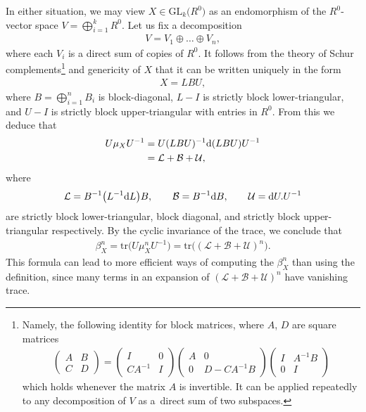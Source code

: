 \documentclass[pdftex]{sigma}%
\numberwithin{equation}{section}
\newcommand{\tr}{\mathrm{tr}}
\newcommand{\GL}{\mathrm{GL}}
\newcommand{\mc}{\mu}
\newcommand{\0}{\color{blue}{\mathsf{0}}}
\begin{document}
\noindent
In either situation,
we may view
$ X \in \GL_k\big(R^0\big) $ as an endomorphism of the $R^0$-vector space $V= \bigoplus_{i=1}^k R^0$. Let us fix a decomposition
\begin{gather*}
V= V_1 \oplus \dots \oplus V_n,
\end{gather*}
where each $V_i$ is a direct sum of copies of $R^0$. It follows from the theory of Schur complements\footnote{Namely, the following identity for block matrices, where $A$, $D$ are square matrices \begin{gather*}
\begin{pmatrix} A& B \\ C & D \end{pmatrix} = \begin{pmatrix} I & 0 \\ CA^{-1} & I \end{pmatrix} \begin{pmatrix} A & 0 \\ 0 & D- C A^{-1}B \end{pmatrix} \begin{pmatrix} I & A^{-1}B \\ 0 & I \end{pmatrix} \end{gather*}
which holds whenever the matrix $A$ is invertible. It can be applied repeatedly to any decomposition of $V$ as a~direct sum of two subspaces. }
 and genericity of $X$ that it can be written uniquely in the form
\begin{gather*} %
X = L B U,
\end{gather*}
where $B= \bigoplus_{i=1}^n B_i$ is block-diagonal, $L-I$ is strictly block lower-triangular, and $U-I$ is strictly block upper-triangular with entries in $R^0$. From this we deduce that
 \begin{align*} \nonumber
 U \mu_X U^{-1} & = U (LBU)^{-1} {\rm d}(LBU) U^{-1}
 \\
 & = \mathcal{L} + \mathcal{B} + \mathcal{U}, \nonumber
 \end{align*}
 where
 \begin{gather} \label{CurlyLBUdef}
 \mathcal{L} = B^{-1} \big( L^{-1} {\rm d}L\big) B , \qquad
 \mathcal{B} = B^{-1} {\rm d}B, \qquad \mathcal{U} = {\rm d}U. U^{-1}
 \end{gather}
 are strictly block lower-triangular, block diagonal, and strictly block upper-triangular respectively. By the cyclic invariance of the trace, we conclude that
 \begin{gather} \label{betaastraceLBU}
 \beta^n_X = \tr \big( U \mc^n_X U^{-1} \big) = \tr
 \big((\mathcal{L} + \mathcal{B} + \mathcal{U})^n\big).
 \end{gather}
 This formula can lead to more efficient ways of computing the $\beta^n_X$ than using the definition, since many terms in an expansion of $(\mathcal{L} + \mathcal{B} + \mathcal{U} )^n$ have vanishing trace.
\end{document}
